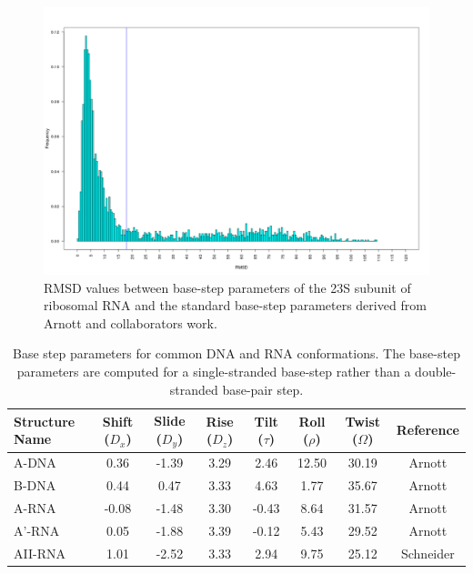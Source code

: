 \begin{figure}
 \centering
\includegraphics[angle=0, scale=0.4]{Chapter2/dormsd.png}
\caption{RMSD values between base-step parameters of the 23S subunit of
  ribosomal RNA and the standard base-step parameters derived from
  Arnott and collaborators \cite{arnott1973} work.}
 \label{fig:dormsd}
\end{figure}

\begin{table}[htbp]
\begin{center}
{\small
\begin{tabular}{p{2cm}|c|c|c|c|c|c|c}
\hline
\textbf{Structure Name} & Shift ($D_x$) & Slide ($D_y$) & Rise ($D_z$) & Tilt
($\tau$) & Roll ($\rho$) & Twist ($\Omega$) & \textbf{Reference} \\ \hline
A-DNA & 0.36 & -1.39 & 3.29 & 2.46 & 12.50 & 30.19 & Arnott \cite{arnott1999} \\ \hline
B-DNA & 0.44 & 0.47 & 3.33 & 4.63 & 1.77 & 35.67   & Arnott \cite{arnott1999} \\ \hline
A-RNA & -0.08 & -1.48 & 3.30 & -0.43 & 8.64 & 31.57 & Arnott \cite{arnott1999} \\ \hline
A'-RNA & 0.05 & -1.88 & 3.39 & -0.12 & 5.43 & 29.52 & Arnott \cite{arnott1999} \\ \hline
AII-RNA & 1.01 & -2.52 & 3.33 & 2.94 & 9.75 & 25.12 & Schneider \cite{schneider2004} \\ \hline
\end{tabular}
}
\caption{Base step parameters for common DNA and RNA
  conformations. The base-step parameters are computed for
  a single-stranded base-step rather than a double-stranded base-pair step.}
\end{center}
\label{tab:conformations}
\end{table}

